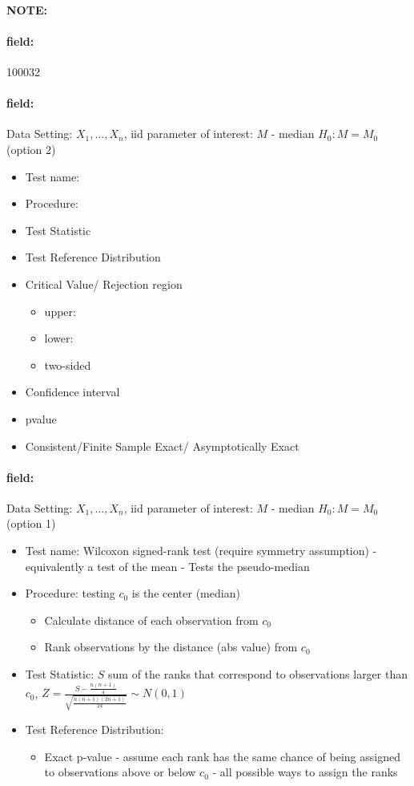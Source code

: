 \documentclass[12pt]{article}
\newenvironment{note}{\paragraph{NOTE:}}{}
\newenvironment{field}{\paragraph{field:}}{}
\begin{document}
\begin{note} \begin{field} \tiny 100032 \end{field}
 \begin{field}
  Data Setting: $X_1, \ldots, X_n$, iid parameter of interest: $M$ - median $H_0: M = M_0$ (option 2)
  \begin{itemize}
   \item Test name:
   \item Procedure:
   \item Test Statistic
   \item Test Reference Distribution
   \item Critical Value/ Rejection region
         \begin{itemize}
          \item upper:
          \item lower:
          \item two-sided
         \end{itemize}
   \item Confidence interval
   \item pvalue
   \item Consistent/Finite Sample Exact/ Asymptotically Exact
  \end{itemize}
 \end{field}
 \begin{field}
  Data Setting: $X_1, \ldots, X_n$, iid parameter of interest: $M$ - median $H_0: M = M_0$ (option 1)
  \begin{itemize}
   \item Test name: Wilcoxon signed-rank test (require symmetry assumption) - equivalently a test of the mean - Tests the pseudo-median
   \item Procedure: testing $c_0$ is the center (median)
         \begin{itemize}
          \item Calculate distance of each observation from $c_0$
          \item Rank observations by the distance (abs value) from $c_0$
         \end{itemize}
   \item Test Statistic: $S$ sum of the ranks that correspond to observations larger than $c_0$, $Z = \frac{S - \frac{n(n+1)}{4}}{\sqrt{\frac{n(n+1)(2n+1)}{24}}} \sim N(0,1)$
   \item Test Reference Distribution:
         \begin{itemize}
          \item Exact p-value - assume each rank has the same chance of being assigned to observations above or below $c_0$ - all possible ways to assign the ranks

\end{itemize}
\end{itemize}
\end{field}
\end{note}
\end{document}
